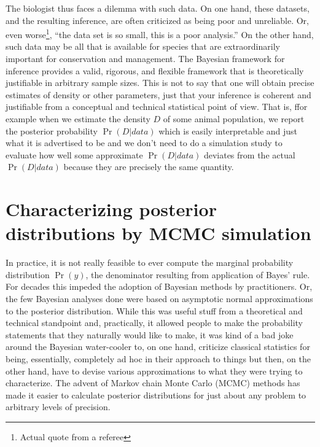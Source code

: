 The biologist thus faces a dilemma with such data. On one hand, these
datasets, and the resulting inference, are often criticized as being
poor and unreliable. Or, even worse\footnote{Actual quote from a
  referee}, ``the data set is so small, this is a poor analysis.''  On
the other hand, such data may be all that is available for species
that are extraordinarily important for conservation and management.
The Bayesian framework for inference provides a valid, rigorous, and
flexible framework that is theoretically justifiable in arbitrary
sample sizes. This is not to say that one will obtain precise
estimates of density or other parameters, just that your inference is
coherent and justifiable from a conceptual and technical statistical
point of view. That is, ffor example when we estimate the density $D$ of some animal population, we report the posterior probability
$\Pr(D|data)$ which is easily interpretable and just what it is
advertised to be and we don't need to do a simulation study to
evaluate how well some approximate $\Pr(D|data)$ deviates from the
actual $\Pr(D|data)$ because they are precisely the same quantity.

\section{Characterizing posterior distributions by MCMC simulation}

In practice, it is not really feasible to ever compute the marginal
probability distribution $\Pr(y)$, the denominator resulting from
application of Bayes' rule. For decades this impeded the adoption of
Bayesian methods by practitioners. Or, the few Bayesian analyses done
were based on asymptotic normal approximations to the posterior
distribution. While this was useful stuff from a theoretical and
technical standpoint and, practically, it allowed people to make the
probability statements that they naturally would like to make, it was
kind of a bad joke around the Bayesian water-cooler to, on one hand,
criticize classical statistics for being, essentially, completely ad
hoc in their approach to things but then, on the other hand, have to
devise various approximations to what they were trying to
characterize. The advent of Markov chain Monte Carlo (MCMC) methods
has made it easier to calculate posterior distributions for just about
any problem to arbitrary levels of precision.

